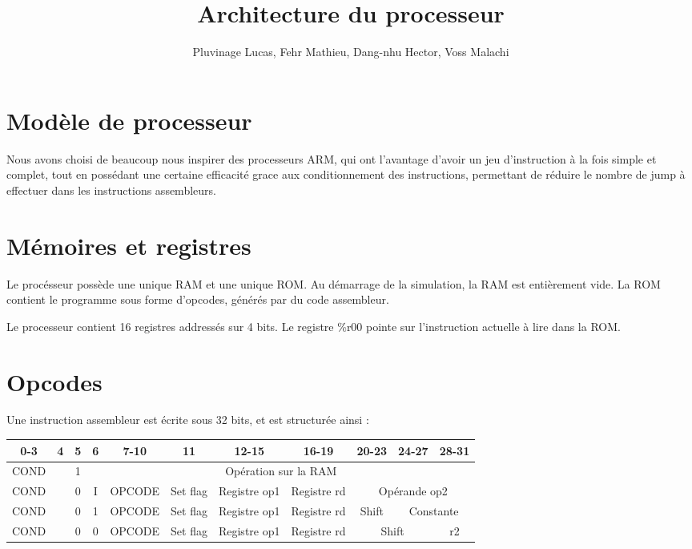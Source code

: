 \documentclass[a4paper]{article}
\title{Architecture du processeur}
\author{Pluvinage Lucas, Fehr Mathieu, Dang-nhu Hector, Voss Malachi}
\begin{document}
\maketitle

\section{Modèle de processeur}

Nous avons choisi de beaucoup nous inspirer des processeurs ARM, qui ont
l'avantage d'avoir un jeu d'instruction à la fois simple et complet, tout en
possédant une certaine efficacité grace aux conditionnement des instructions,
permettant de réduire le nombre de jump à effectuer dans les instructions
assembleurs.

\section{Mémoires et registres}

Le procésseur possède une unique RAM et une unique ROM. Au démarrage de la
simulation, la RAM est entièrement vide. La ROM contient le programme sous forme
d'opcodes, générés par du code assembleur.

Le processeur contient 16 registres addressés sur 4 bits. Le registre \%r00
pointe sur l'instruction actuelle à lire dans la ROM.

\section{Opcodes}

Une instruction assembleur est écrite sous 32 bits, et est structurée ainsi :

\begin{tabular}{|c|c|c|c|c|c|c|c|c|c|c|}
  \hline
  0-3  & 4 & 5 & 6 & 7-10 & 11 & 12-15 & 16-19 & 20-23 & 24-27 & 28-31 \\
  \hline
  COND &   & 1 & \multicolumn{8}{c|}{Opération sur la RAM} \\
  \hline
  COND &   & 0 & I & OPCODE & Set flag & Registre op1 & Registre rd & \multicolumn{3}{c|}{Opérande op2}  \\
  \hline
  COND &   & 0 & 1 & OPCODE & Set flag & Registre op1 & Registre rd & Shift & \multicolumn{2}{c|}{Constante} \\
  \hline
  COND &   & 0 & 0 & OPCODE & Set flag & Registre op1 & Registre rd & \multicolumn{2}{c|}{Shift} & r2  \\
  \hline
\end{tabular}
\end{document}
